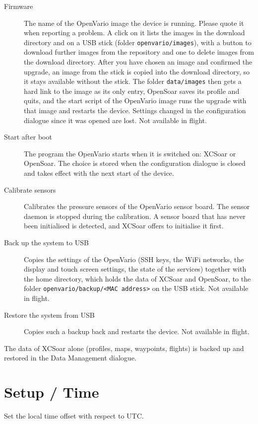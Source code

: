 \begin{description}
\item[Firmware]  The name of the OpenVario image the device is
  running.  Please quote it when reporting a problem.  A click on it
  lists the images in the download directory and on a USB stick (folder
  \texttt{openvario/images}), with a button to download further images
  from the repository and one to delete images from the download
  directory.  After you have chosen an image and confirmed the upgrade,
  an image from the stick is copied into the download directory, so it
  stays available without the stick.  The folder \texttt{data/images}
  then gets a hard link to the image as its only entry, OpenSoar saves
  its profile and quits, and the start script of the OpenVario image
  runs the upgrade with that image and restarts the device.  Settings
  changed in the configuration dialogue since it was opened are lost.
  Not available in flight.
\item[Start after boot]  The program the OpenVario starts when it is
  switched on: XCSoar or OpenSoar.  The choice is stored when the
  configuration dialogue is closed and takes effect with the next start
  of the device.
\item[Calibrate sensors]  Calibrates the pressure sensors of the
  OpenVario sensor board.  The sensor daemon is stopped during the
  calibration.  A sensor board that has never been initialised is
  detected, and XCSoar offers to initialise it first.
\item[Back up the system to USB]  Copies the settings of the OpenVario
  (SSH keys, the WiFi networks, the display and touch screen settings,
  the state of the services) together with the home directory, which
  holds the data of XCSoar and OpenSoar, to the folder
  \texttt{openvario/backup/<MAC address>} on the USB stick.  Not
  available in flight.
\item[Restore the system from USB]  Copies such a backup back and
  restarts the device.  Not available in flight.
\end{description}

The data of XCSoar alone (profiles, maps, waypoints, flights) is backed up
and restored in the Data Management dialogue.


\section{Setup / Time}

Set the local time offset with respect to UTC.

